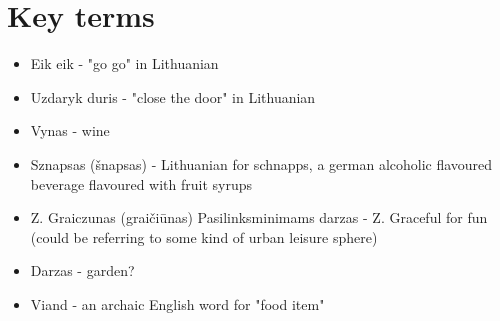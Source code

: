 \documentclass[12pt]{book}
\begin{document}
\section*{Key terms}
\begin{itemize}
    \item Eik eik - "go go" in Lithuanian
    \item Uzdaryk duris - "close the door" in Lithuanian
    \item Vynas - wine
    \item Sznapsas (šnapsas) - Lithuanian for schnapps, a german alcoholic flavoured beverage flavoured with fruit syrups
    \item Z. Graiczunas (graičiūnas) Pasilinksminimams darzas - Z. Graceful for fun (could be referring to some kind of urban leisure sphere)
    \item Darzas - garden?
    \item Viand - an archaic English word for "food item"
\end{itemize}
\end{document}
